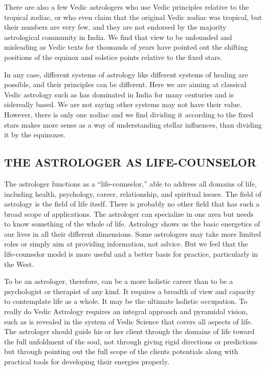  

There are also a few Vedic astrologers who use Vedic principles relative to the tropical zodiac, or who even claim that the original Vedic zodiac was tropical, but their numbers are very few, and they are not endorsed by the majority astrological community in India.  We find that view to be unfounded and misleading as Vedic texts for thousands of years have pointed out the shifting positions of the equinox and solstice points relative to the fixed stars.

 

In any case, different systems of astrology like different systems of healing are possible, and their principles can be different. Here we are aiming at classical Vedic astrology such as has dominated in India for many centuries and is sidereally based. We are not saying other systems may not have their value. However, there is only one zodiac and we find dividing it according to the fixed stars makes more sense as a way of understanding stellar influences, than dividing it by the equinoxes.

 



 

 

\subsection{THE ASTROLOGER AS LIFE-COUNSELOR}
 

The astrologer functions as a “life-counselor,” able to address all domains of life, including health, psychology, career, relation­ship, and spiritual issues. The field of astrology is the field of life itself. There is probably no other field that has such a broad scope of applications. The astrologer can specialize in one area but needs to know something of the whole of life. Astrol­ogy shows us the basic energetics of our lives in all their different dimensions. Some astrologers may take more limited roles or simply aim at providing information, not advice. But we feel that the life-counselor model is more useful and a better basis for practice, particularly in the West.

 

To be an astrologer, therefore, can be a more holistic career than to be a  psychologist or therapist of any kind. It requires a breadth of view and capacity to contemplate life as a whole. It may be the ultimate holistic occupation. To really do Vedic Astrology requires an integral approach and pyramidal vision, such as is revealed in the system of Vedic Science that covers all aspects of life. The astrologer should guide his or her client through the domains of life toward the full unfoldment of the soul, not through giving rigid directions or predictions but through pointing out the full scope of the clients potentials along with practical tools for developing their energies properly.

